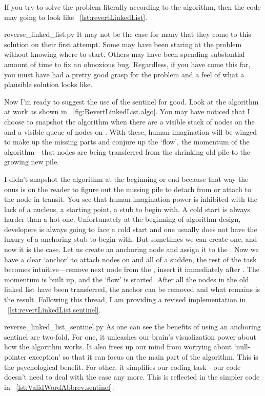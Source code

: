 If you try to solve the problem literally according to the algorithm,
then the code may going to look like ~\autoref{lst:revertLinkedList}.

{reverse_linked_list.py}
It may not be the case for many that they come to this solution on their first attempt.
Some may have been staring at the problem without knowing where to start.
Others may have been spending substantial amount of time to fix an obnoxious bug.
Regardless, if you have come this far, you must have had a pretty good grasp for the problem
and a feel of what a plausible solution looks like.

Now I'm ready to suggest the use of the sentinel for good.
Look at the algorithm at work as shown in ~\autoref{fig:RevertLinkedList.algo}.
You may have noticed that I choose to snapshot the algorithm when there
are a visible stack of nodes on the  and a visible queue of
nodes on .
With these, human imagination will be winged to make up the missing parts and
conjure up the `flow', the momentum of the algorithm---that nodes
are being transferred from the shrinking old pile to the growing new pile.

I didn't snapshot the algorithm at the beginning or end because that way the onus is on the reader
to figure out the missing pile to detach from or attach to the node in transit.
You see that human imagination power is inhibited with the lack of a nucleus, a starting point,
a stub to begin with.
A cold start is always harder than a hot one.
Unfortunately at the beginning of algorithm design, developers is always going to face a cold start
and one usually does not have the luxury of a anchoring stub to begin with.
But sometimes we can create one, and now it is the case.
Let us create an anchoring node and assign it to the .
Now we have a clear `anchor' to attach nodes on and all of a sudden, the rest of the task becomes
intuitive---remove next node from the , insert it immediately after .
The momentum is built up, and the `flow' is started.
After all the nodes in the old linked list have been transferred, the anchor can be removed and
what remains is the result.
Following this thread, I am providing a revised implementation in
~\autoref{lst:revertLinkedList.sentinel}.

{reverse_linked_list_sentinel.py}
As one can see the benefits of using an anchoring sentinel are two-fold.
For one, it unleashes our brain's visualization power about how the algorithm works.
It also frees up our mind from worrying about `null-pointer exception' so that it can focus on
the main part of the algorithm.
This is the psychological benefit.
For other, it simplifies our coding task---our code doesn't need to deal with the case
 any more.
This is reflected in the simpler code in ~\autoref{lst:ValidWordAbbrev.sentinel}.


